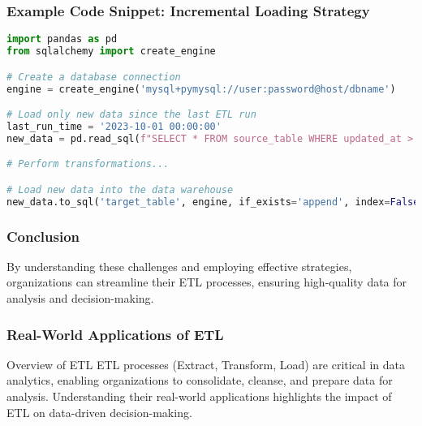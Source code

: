 \documentclass[aspectratio=169]{beamer}
\begin{document}
\begin{frame}[fragile]
    \frametitle{Example Code Snippet: Incremental Loading Strategy}
    \begin{lstlisting}[language=Python]
import pandas as pd
from sqlalchemy import create_engine

# Create a database connection
engine = create_engine('mysql+pymysql://user:password@host/dbname')

# Load only new data since the last ETL run
last_run_time = '2023-10-01 00:00:00'
new_data = pd.read_sql(f"SELECT * FROM source_table WHERE updated_at > '{last_run_time}'", engine)

# Perform transformations...

# Load new data into the data warehouse
new_data.to_sql('target_table', engine, if_exists='append', index=False)
    \end{lstlisting}
\end{frame}

\begin{frame}
    \frametitle{Conclusion}
    By understanding these challenges and employing effective strategies, organizations can streamline their ETL processes, ensuring high-quality data for analysis and decision-making.
\end{frame}

\begin{frame}
    \frametitle{Real-World Applications of ETL}
    \begin{block}{Overview of ETL}
        ETL processes (Extract, Transform, Load) are critical in data analytics, enabling organizations to consolidate, cleanse, and prepare data for analysis. Understanding their real-world applications highlights the impact of ETL on data-driven decision-making.
    \end{block}
\end{frame}
\end{document}
